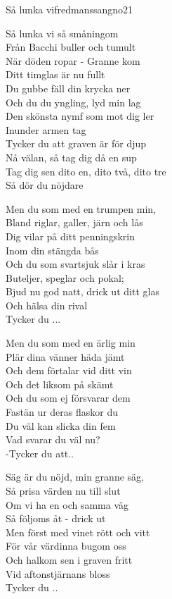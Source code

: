 \begin{song}{Så lunka vi}{fredmanssangno21}
\begin{vers}
Så lunka vi så småningom \\
Från Bacchi buller och tumult\\
När döden ropar - Granne kom\\
Ditt timglas är nu fullt\\
Du gubbe fäll din krycka ner\\
Och du du yngling, lyd min lag\\
Den skönsta nymf som mot dig ler\\
Inunder armen tag\\
Tycker du att graven är för djup\\
Nå välan, så tag dig då en sup\\
Tag dig sen dito en, dito två, dito tre\\
Så dör du nöjdare\\
\end{vers}
\begin{vers}
Men du som med en trumpen min, \\
Bland riglar, galler, järn och lås\\
Dig vilar på ditt penningskrin\\
Inom din stängda bås\\
Och du som svartsjuk slår i kras\\
Buteljer, speglar och pokal;\\
Bjud nu god natt, drick ut ditt glas\\
Och hälsa din rival\\
Tycker du ...\\
\end{vers}
\newp
\begin{vers}
Men du som med en ärlig min\\
Plär dina vänner häda jämt\\
Och dem förtalar vid ditt vin\\
Och det liksom på skämt\\
Och du som ej försvarar dem\\
Fastän ur deras flaskor du\\
Du väl kan slicka din fem\\
Vad svarar du väl nu?\\
-Tycker du att..\\
\end{vers}
\begin{vers}
Säg är du nöjd, min granne säg, \\
Så prisa värden nu till slut\\
Om vi ha en och samma väg\\
Så följoms åt - drick ut\\
Men först med vinet rött och vitt\\
För vår värdinna bugom oss\\
Och halkom sen i graven fritt\\
Vid aftonstjärnans bloss\\
Tycker du ..\\
\end{vers}
\end{song}
